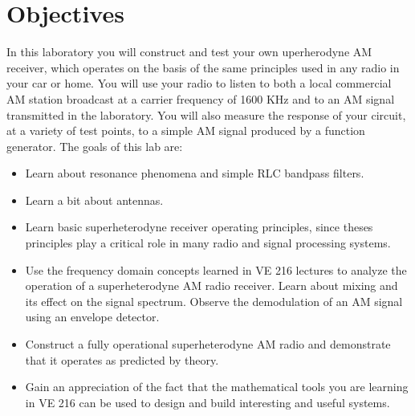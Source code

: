 \documentclass{article}
\begin{document}
\section{Objectives}
In this laboratory you will construct and test your own uperherodyne AM receiver, which operates on the basis of the same principles used in any radio in your car or home. You will use your radio to listen to both a local commercial AM station broadcast at a carrier frequency of 1600 KHz and to an AM signal transmitted in the laboratory. You will also measure the response of your circuit, at a variety of test points, to a simple AM signal produced by a function generator. The goals of this lab are:\\
\begin{itemize}
\item Learn about resonance phenomena and simple RLC bandpass filters.
\item Learn a bit about antennas.
\item Learn basic superheterodyne receiver operating principles, since theses principles play a critical role in many radio and signal processing systems.
\item Use the frequency domain concepts learned in VE 216 lectures to analyze the operation of a
superheterodyne AM radio receiver. Learn about mixing and its effect on the signal spectrum. Observe the demodulation of an AM signal using an envelope detector.
\item Construct a fully operational superheterodyne AM radio and demonstrate that it operates as predicted by theory.
\item Gain an appreciation of the fact that the mathematical tools you are learning in VE 216 can be used to design and build interesting and useful systems.
\end{itemize}
\end{document}
